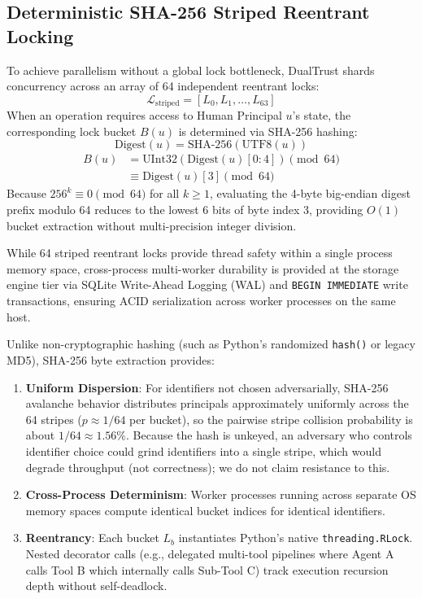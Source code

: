 \documentclass[journal]{IEEEtran}
\begin{document}
\subsection{Deterministic SHA-256 Striped Reentrant Locking}
To achieve parallelism without a global lock bottleneck, DualTrust shards concurrency across an array of 64 independent reentrant locks:
\begin{equation}
\mathcal{L}_{\text{striped}} = [L_0, L_1, \dots, L_{63}]
\end{equation}
When an operation requires access to Human Principal $u$'s state, the corresponding lock bucket $B(u)$ is determined via SHA-256 hashing:
\begin{equation}
\text{Digest}(u) = \text{SHA-256}(\text{UTF8}(u))
\end{equation}
\begin{equation}
\begin{aligned}
B(u) &= \text{UInt32}(\text{Digest}(u)[0:4]) \pmod{64} \\
&\equiv \text{Digest}(u)[3] \pmod{64}
\end{aligned}
\label{eq:striped_hash}
\end{equation}
Because $256^k \equiv 0 \pmod{64}$ for all $k \ge 1$, evaluating the 4-byte big-endian digest prefix modulo 64 reduces to the lowest 6 bits of byte index 3, providing $O(1)$ bucket extraction without multi-precision integer division.

While 64 striped reentrant locks provide thread safety within a single process memory space, cross-process multi-worker durability is provided at the storage engine tier via SQLite Write-Ahead Logging (WAL) and \texttt{BEGIN IMMEDIATE} write transactions, ensuring ACID serialization across worker processes on the same host.

Unlike non-cryptographic hashing (such as Python's randomized \texttt{hash()} or legacy MD5), SHA-256 byte extraction provides:
\begin{enumerate}[leftmargin=12pt, topsep=2pt, itemsep=1pt]
\item \textbf{Uniform Dispersion}: For identifiers not chosen adversarially, SHA-256 avalanche behavior distributes principals approximately uniformly across the 64 stripes ($p \approx 1/64$ per bucket), so the pairwise stripe collision probability is about $1/64 \approx 1.56\%$. Because the hash is unkeyed, an adversary who controls identifier choice could grind identifiers into a single stripe, which would degrade throughput (not correctness); we do not claim resistance to this.
\item \textbf{Cross-Process Determinism}: Worker processes running across separate OS memory spaces compute identical bucket indices for identical identifiers.
\item \textbf{Reentrancy}: Each bucket $L_b$ instantiates Python's native \texttt{threading.RLock}. Nested decorator calls (e.g., delegated multi-tool pipelines where Agent A calls Tool B which internally calls Sub-Tool C) track execution recursion depth without self-deadlock.
\end{enumerate}
\end{document}
